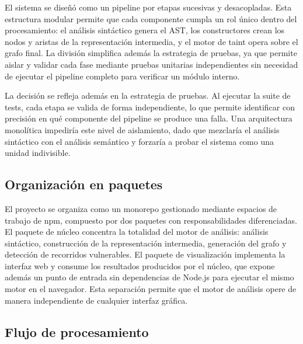 El sistema se diseñó como un pipeline por etapas sucesivas y desacopladas. Esta estructura modular permite que cada componente cumpla un rol único dentro del procesamiento: el análisis sintáctico genera el AST, los constructores crean los nodos y aristas de la representación intermedia, y el motor de taint opera sobre el grafo final. La división simplifica además la estrategia de pruebas, ya que permite aislar y validar cada fase mediante pruebas unitarias independientes sin necesidad de ejecutar el pipeline completo para verificar un módulo interno.

La decisión se refleja además en la estrategia de pruebas. Al ejecutar la suite de tests, cada etapa se valida de forma independiente, lo que permite identificar con precisión en qué componente del pipeline se produce una falla. Una arquitectura monolítica impediría este nivel de aislamiento, dado que mezclaría el análisis sintáctico con el análisis semántico y forzaría a probar el sistema como una unidad indivisible.

\subsection{Organización en paquetes}\label{sec:n4.1.1}

El proyecto se organiza como un monorepo gestionado mediante espacios de trabajo de npm, compuesto por dos paquetes con responsabilidades diferenciadas. El paquete de núcleo concentra la totalidad del motor de análisis: análisis sintáctico, construcción de la representación intermedia, generación del grafo y detección de recorridos vulnerables. El paquete de visualización implementa la interfaz web y consume los resultados producidos por el núcleo, que expone además un punto de entrada sin dependencias de Node.js para ejecutar el mismo motor en el navegador. Esta separación permite que el motor de análisis opere de manera independiente de cualquier interfaz gráfica.

\subsection{Flujo de procesamiento}\label{sec:n4.1.2}

